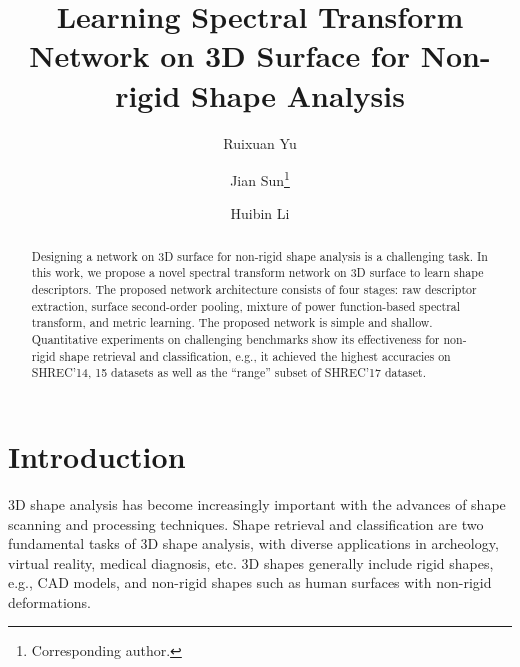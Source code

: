 \documentclass[runningheads]{llncs}
\begin{document}
\title{Learning Spectral Transform Network on 3D Surface for Non-rigid Shape Analysis} 
\author{Ruixuan Yu \and Jian Sun\thanks{Corresponding author.} \and Huibin Li}
\maketitle             

\begin{abstract}
Designing a network on 3D surface for non-rigid shape analysis is a challenging task. In this work, we propose a novel  spectral transform network on 3D surface to learn shape descriptors. The proposed network architecture consists of four stages: raw descriptor extraction, surface second-order pooling, mixture of power function-based spectral transform, and metric learning. The proposed network is simple and shallow. Quantitative experiments on challenging benchmarks show its effectiveness for non-rigid shape retrieval and classification, e.g., it achieved the highest accuracies on SHREC'14, 15 datasets as well as the ``range'' subset of SHREC'17 dataset.

\end{abstract}

\section{Introduction}
3D shape analysis has  become increasingly important with the advances of shape scanning and  processing techniques. Shape retrieval and classification are two fundamental tasks of 3D shape analysis, with diverse applications in archeology,  virtual reality, medical diagnosis, etc. 3D shapes generally include rigid shapes,  e.g., CAD models, and non-rigid shapes such as human surfaces with non-rigid deformations. 
\end{document}
